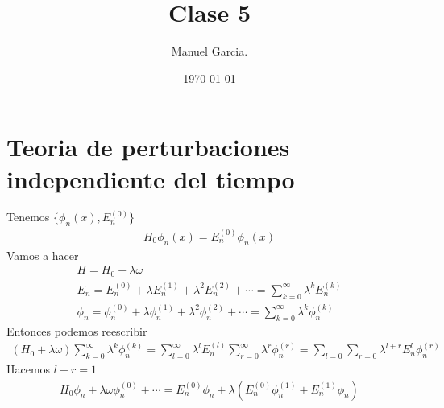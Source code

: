 \documentclass{article}
\title{Clase 5}
\author{Manuel Garcia.}
\date{\today}
\begin{document}
\maketitle

\section{Teoria de perturbaciones independiente del tiempo}
Tenemos $ \{\phi_n (x), E_n ^ {(0 )}\} $
\begin{gather*}
  H_0 \phi_n (x) = E_n ^ {(0)} \phi_n (x)  
\end{gather*}
Vamos a hacer 
\begin{gather*}
  H = H_0 +\lambda \omega \\
  E_n = E_n ^ {(0)} + \lambda E_n ^ {(1)} + \lambda^2 E_n ^ {(2) } + \cdots = \displaystyle\sum_{k = 0 }^{ \infty} \lambda ^ {k } E_n ^ {(k)}\\
  \phi_n = \phi_n ^ {(0)} + \lambda \phi_n ^ {(1)} + \lambda^2 \phi_n ^ {(2)} + \cdots = \displaystyle\sum_{k = 0 }^{\infty} \lambda^k \phi_n ^ {(k)}
\end{gather*}
Entonces podemos reescribir 
\begin{gather*}
  (H_0 + \lambda \omega) \displaystyle\sum_{k = 0 }^{\infty} \lambda ^ {k } \phi_n ^ {(k)} = \displaystyle\sum_{l = 0 }^{\infty} \lambda ^ {l } E_n ^ {(l)} \displaystyle\sum_{r = 0 }^{\infty} \lambda ^ {r } \phi_n ^ {(r)} = \displaystyle\sum_{l = 0 }^{} \displaystyle\sum_{ r = 0 }^{} \lambda ^ {l + r } E _{n } ^ {l } \phi_n ^ {(r)}
\end{gather*}
Hacemos $ l + r = 1  $ 
\begin{gather*}
  H_0 \phi_n + \lambda \omega \phi_n ^ {(0 )} + \cdots = E_n ^ {(0)}\phi_n + \lambda(E_n ^ {(0) }\phi_n ^ {(1)} + E_n ^ {(1)}\phi_n ) 
\end{gather*}
\end{document}

